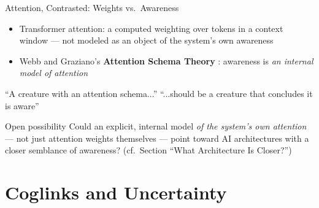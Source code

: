 \documentclass[aspectratio=169]{beamer}
\begin{document}
\begin{frame}{Attention, Contrasted: Weights vs.\ Awareness}
  \begin{itemize}
    \item<1-> Transformer attention: a computed weighting over tokens in a context window --- not modeled as an object of the system's own awareness
    \item<2-> Webb and Graziano's \textbf{Attention Schema Theory} \parencite{webbgraziano2015attention}: awareness is \emph{an internal model of attention}
  \end{itemize}

  \pause
  \vspace{1em}
  \begin{block}{``A creature with an attention schema...''}
    ``...should be a creature that concludes it is aware'' \parencite{webbgraziano2015attention}
  \end{block}

  \pause
  \vspace{1em}
  \begin{alertblock}{Open possibility}
    Could an explicit, internal model \emph{of the system's own attention} --- not just attention weights themselves --- point toward AI architectures with a closer semblance of awareness? (cf.\ Section ``What Architecture Is Closer?'')
  \end{alertblock}
\end{frame}

\section{Coglinks and Uncertainty}
\end{document}
